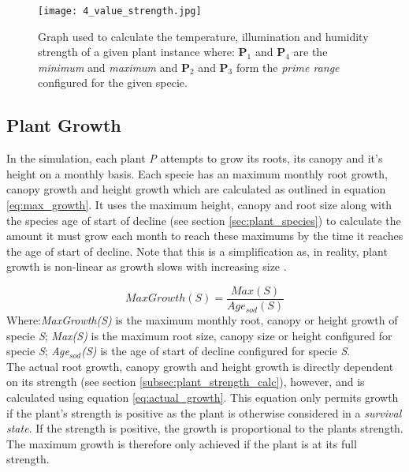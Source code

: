 \begin{figure}
\center
	\texttt{[image: 4\_value\_strength.jpg]}
	\caption{ Graph used to calculate the temperature, illumination and humidity strength of a given plant instance where: \textbf{P$_{1}$} and \textbf{P$_{4}$} are the \textit{minimum} and \textit{maximum} and \textbf{P$_{2}$} and \textbf{P$_{3}$} form the \textit{prime range} configured for the given specie.  }	
	\label{fig:strength_calc_temp}
\end{figure}

\subsection{Plant Growth}

In the simulation, each plant \textit{P} attempts to grow its roots, its canopy and it's height on a monthly basis. Each specie has an maximum monthly root growth, canopy growth and height growth which are calculated as outlined in equation \ref{eq:max_growth}. It uses the maximum height, canopy and root size along with the species age of start of decline (see section \ref{sec:plant_species}) to calculate the amount it must grow each month to reach these maximums by the time it reaches the age of start of decline. Note that this is a simplification as, in reality, plant growth is non-linear as growth slows with increasing size \cite{Paine2012}.

\begin{equation}
MaxGrowth(S) = \frac{Max(S)}{Age_{sod}(S)}
\label{eq:max_growth}
\end{equation}
Where:\textit{MaxGrowth(S)} is the maximum monthly root, canopy or height growth of specie \textit{S}; \textit{Max(S)} is the maximum root size, canopy size or height configured for specie \textit{S}; \textit{Age$_{sod}$(S)} is the age of start of decline configured for specie \textit{S}.\\

The actual root growth, canopy growth and height growth is directly dependent on its strength (see section \ref{subsec:plant_strength_calc}), however, and is calculated using equation \ref{eq:actual_growth}. This equation only permits growth if the plant's strength is positive as the plant is otherwise considered in a \textit{survival state}. If the strength is positive, the growth is proportional to the plants strength. The maximum growth is therefore only achieved if the plant is at its full strength.\\

